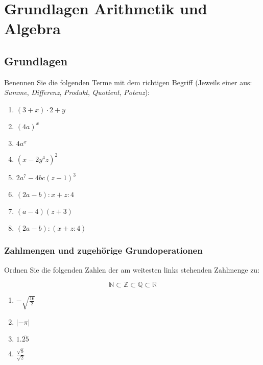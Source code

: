 

\section{Grundlagen Arithmetik und Algebra}


\subsection{Grundlagen}
Benennen Sie die folgenden Terme mit dem richtigen Begriff
(Jeweils einer aus: \textit{Summe}, \textit{Differenz}, \textit{Produkt},
\textit{Quotient}, \textit{Potenz}):


\begin{multicols}{3}
\begin{enumerate}[label=\alph*)]
 \item $(3+x)\cdot{}2 + y$ 
 \item $(4a)^x$ 
 \item$4a^x$ 
 \item$(x-2y^4z)^2$ 
 \item$2a^7 - 4bc(z-1)^3$ 
 \item$(2a -b) : x + z : 4$ 
 \item$(a-4)(z+3)$ 
 \item$(2a-b):(x+z:4)$ 
\end{enumerate}
\end{multicols}

\subsubsection{Zahlmengen und zugehörige Grundoperationen}
Ordnen Sie die folgenden Zahlen der am weitesten links stehenden
Zahlmenge zu:

$$\mathbb{N} \subset \mathbb{Z} \subset \mathbb{Q} \subset \mathbb{R}$$

\begin{multicols}{2}
\begin{enumerate}[label=\alph*)]
 \item$-\sqrt{\frac{16}{2}}$ 
 \item$|-\pi|$ 
 \item$1.\overline{25}$ 
 \item$\frac{\sqrt{8}}{\sqrt{2}}$ 
\end{enumerate}
\end{multicols}


